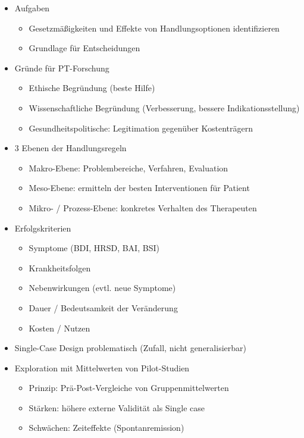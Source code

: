 \documentclass[11pt, paper=a4, twocolumn]{scrartcl}
\begin{document}
		\begin{itemize}
			\item Aufgaben
				\begin{itemize}
					\item Gesetzmäßigkeiten und Effekte von Handlungsoptionen identifizieren
					\item Grundlage für Entscheidungen
				\end{itemize}
			\item Gründe für PT-Forschung
				\begin{itemize}
					\item Ethische Begründung (beste Hilfe)
					\item Wissenschaftliche Begründung (Verbesserung, bessere Indikationsstellung)
					\item Gesundheitspolitische: Legitimation gegenüber Kostenträgern
				\end{itemize}
			\item 3 Ebenen der Handlungsregeln
				\begin{itemize}
					\item Makro-Ebene: Problembereiche, Verfahren, Evaluation
					\item Meso-Ebene: ermitteln der besten Interventionen für Patient
					\item Mikro- / Prozess-Ebene: konkretes Verhalten des Therapeuten
				\end{itemize}
			\item Erfolgskriterien
				\begin{itemize}
					\item Symptome (BDI, HRSD, BAI, BSI)
					\item Krankheitsfolgen
					\item Nebenwirkungen (evtl. neue Symptome)
					\item Dauer / Bedeutsamkeit der Veränderung
					\item Kosten / Nutzen
				\end{itemize}
			\item Single-Case Design problematisch (Zufall, nicht generalisierbar)
			\item Exploration mit Mittelwerten von Pilot-Studien
				\begin{itemize}
					\item Prinzip: Prä-Post-Vergleiche von Gruppenmittelwerten
					\item Stärken: höhere externe Validität als Single case
					\item Schwächen: Zeiteffekte (Spontanremission)

\end{itemize}
\end{itemize}
\end{document}
